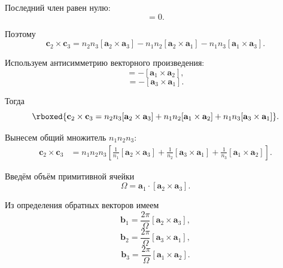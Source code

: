 \documentclass[../final.tex]{subfiles}
\begin{document}
Последний член равен нулю:
%
\begin{equation*}
    [\mathbf a_1\times\mathbf a_1]=0.
\end{equation*}

Поэтому
%
\begin{equation*}
    \mathbf c_2\times\mathbf c_3
    =
    n_2n_3
    [\mathbf a_2\times\mathbf a_3]
    -
    n_1n_2
    [\mathbf a_2\times\mathbf a_1]
    -
    n_1n_3
    [\mathbf a_1\times\mathbf a_3].
\end{equation*}

Используем антисимметрию векторного произведения:
%
\begin{equation*}
    [\mathbf a_2\times\mathbf a_1]
    =
    -[\mathbf a_1\times\mathbf a_2],
\end{equation*}
%
\begin{equation*}
    [\mathbf a_1\times\mathbf a_3]
    =
    -[\mathbf a_3\times\mathbf a_1].
\end{equation*}

Тогда
%
\begin{equation*}
    \rboxed{
        \mathbf c_2\times\mathbf c_3
        =
        n_2n_3
        [\mathbf a_2\times\mathbf a_3]
        +
        n_1n_2
        [\mathbf a_1\times\mathbf a_2]
        +
        n_1n_3
        [\mathbf a_3\times\mathbf a_1]
    }.
\end{equation*}

Вынесем общий множитель $n_1n_2n_3$:
%
\begin{align*}
    \mathbf c_2\times\mathbf c_3
    &=
    n_1n_2n_3
    \left[
        \frac{1}{n_1}
        [\mathbf a_2\times\mathbf a_3]
        +
        \frac{1}{n_2}
        [\mathbf a_3\times\mathbf a_1]
        +
        \frac{1}{n_3}
        [\mathbf a_1\times\mathbf a_2]
    \right].
\end{align*}

Введём объём примитивной ячейки
%
\begin{equation*}
    \Omega
    =
    \mathbf a_1\cdot
    [\mathbf a_2\times\mathbf a_3].
\end{equation*}

Из определения обратных векторов имеем
%
\begin{equation*}
    \mathbf b_1
    =
    \frac{2\pi}{\Omega}
    [\mathbf a_2\times\mathbf a_3],
\end{equation*}
%
\begin{equation*}
    \mathbf b_2
    =
    \frac{2\pi}{\Omega}
    [\mathbf a_3\times\mathbf a_1],
\end{equation*}
%
\begin{equation*}
    \mathbf b_3
    =
    \frac{2\pi}{\Omega}
    [\mathbf a_1\times\mathbf a_2].
\end{equation*}
\end{document}
